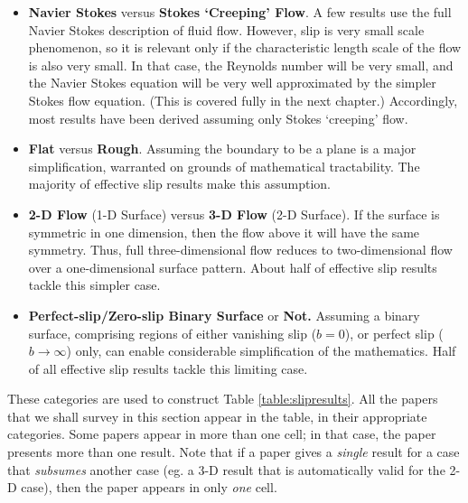 \documentclass[12pt, a4paper, twoside, openright]{book}
\begin{document}
\begin{itemize}

\item \textbf{Navier Stokes} versus \textbf{Stokes `Creeping' Flow}.  A few results use the full Navier Stokes description of fluid flow.  However, slip is very small scale phenomenon, so it is relevant only if the characteristic length scale of the flow is also very small.  In that case, the Reynolds number will be very small, and the Navier Stokes equation will be very well approximated by the simpler Stokes flow equation.  (This is covered fully in the next chapter.)  Accordingly, most results have been derived assuming only Stokes `creeping' flow.

\item \textbf{Flat} versus \textbf{Rough}. Assuming the boundary to be a plane is a major simplification, warranted on grounds of mathematical tractability.  The majority of effective slip results make this assumption.

\item \textbf{2-D Flow} (1-D Surface) versus \textbf{3-D Flow} (2-D Surface).
If the surface is symmetric in one dimension, then the flow above it will have the same symmetry.  Thus, full three-dimensional flow reduces to two-dimensional flow over a one-dimensional surface pattern.  About half of effective slip results tackle this simpler case.

\item \textbf{Perfect-slip/Zero-slip Binary Surface} or \textbf{Not.}  Assuming a binary surface, comprising regions of either vanishing slip ($b=0$), or perfect slip ($b \rightarrow \infty$) only, can enable considerable simplification of the mathematics.  Half of all effective slip results tackle this limiting case.

\end{itemize}

These categories are used to construct Table \ref{table:slipresults}.  All the papers that we shall survey in this section appear in the table, in their appropriate categories.  Some papers appear in more than one cell; in that case, the paper presents more than one result.  Note that if a paper gives a \emph{single} result for a case that \emph{subsumes} another case (eg. a 3-D result that is automatically valid for the 2-D case), then the paper appears in only \emph{one} cell.
\end{document}
